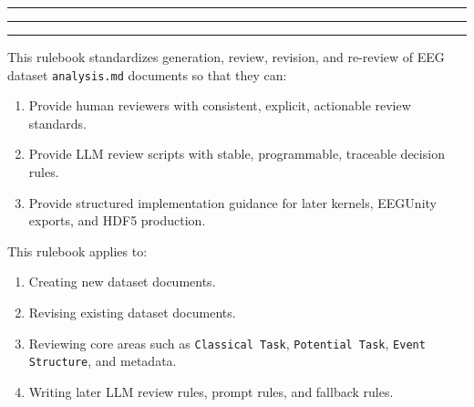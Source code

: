 
\begin{tcolorbox}[breakable,enhanced,colback=white,colframe=gray!50,boxrule=0.8pt,arc=4pt,left=8pt,right=8pt,top=6pt,bottom=6pt,title={\normalsize\bfseries NeuroAudit Rulebook v1.0.0},coltitle=black,colbacktitle=gray!15,titlerule=0.5pt]
\small
\par\bigskip
\noindent\rule{\linewidth}{0.8pt}\par\nopagebreak
{}\par\nopagebreak
\noindent\rule{\linewidth}{0.8pt}\par\smallskip

\medskip{}
\par\nopagebreak\noindent\rule{\linewidth}{0.4pt}\par\smallskip

\smallskip{}\par\smallskip

\noindent This rulebook standardizes generation, review, revision, and re-review of EEG dataset \texttt{analysis.md} documents so that they can:\par\smallskip

\begin{enumerate}[leftmargin=1.5em,noitemsep,topsep=2pt]
\item Provide human reviewers with consistent, explicit, actionable review standards.
\item Provide LLM review scripts with stable, programmable, traceable decision rules.
\item Provide structured implementation guidance for later kernels, EEGUnity exports, and HDF5 production.
\end{enumerate}

\smallskip{}\par\smallskip

\noindent This rulebook applies to:\par\smallskip

\begin{enumerate}[leftmargin=1.5em,noitemsep,topsep=2pt]
\item Creating new dataset documents.
\item Revising existing dataset documents.
\item Reviewing core areas such as \texttt{Classical Task}, \texttt{Potential Task}, \texttt{Event Structure}, and metadata.
\item Writing later LLM review rules, prompt rules, and fallback rules.
\end{enumerate}


\end{tcolorbox}
